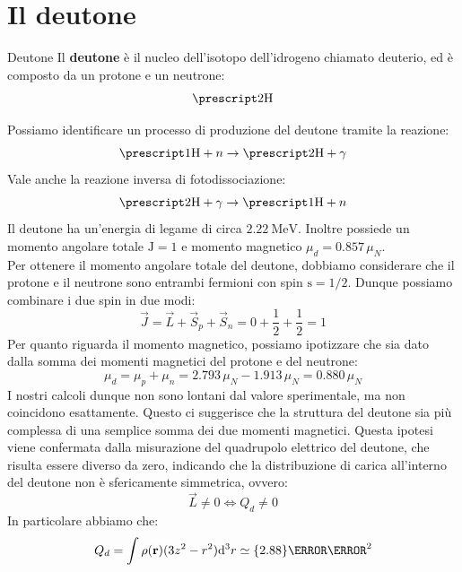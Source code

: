 \section{Il deutone}
\begin{definition}{Deutone}
    Il \textbf{deutone} è il nucleo dell'isotopo dell'idrogeno chiamato deuterio, ed è composto da un protone e un neutrone:
    \begin{equation}
     \atom{H}{2}{}
    \end{equation}
\end{definition}
Possiamo identificare un processo di produzione del deutone tramite la reazione:
\begin{equation}
 \atom{H}{1}{} + n \rightarrow \atom{H}{2}{} + \gamma
\end{equation}
Vale anche la reazione inversa di fotodissociazione:
\begin{equation}
 \atom{H}{2}{} + \gamma \rightarrow \atom{H}{1}{} + n
\end{equation}
Il deutone ha un'energia di legame di circa $\qty{2.22}{\mega\electronvolt}$. Inoltre possiede un momento angolare totale $\text{J}=1$ e momento magnetico $\mu_d = 0.857 \,\mu_N$.\\
Per ottenere il momento angolare totale del deutone, dobbiamo considerare che il protone e il neutrone sono entrambi fermioni con spin $\text{s}=1/2$. Dunque possiamo combinare i due spin in due modi:
\begin{equation}
  \vec{J} = \vec{L} + \vec{S}_p + \vec{S}_n = 0 + \dfrac{1}{2} + \dfrac{1}{2} = 1
\end{equation}
Per quanto riguarda il momento magnetico, possiamo ipotizzare che sia dato dalla somma dei momenti magnetici del protone e del neutrone:
\begin{equation}
 \mu_d = \mu_p + \mu_n = 2.793\,\mu_N - 1.913\,\mu_N = 0.880\,\mu_N
\end{equation}
I nostri calcoli dunque non sono lontani dal valore sperimentale, ma non coincidono esattamente. Questo ci suggerisce che la struttura del deutone sia più complessa di una semplice somma dei due momenti magnetici. Questa ipotesi viene confermata dalla misurazione del quadrupolo elettrico del deutone, che risulta essere diverso da zero, indicando che la distribuzione di carica all'interno del deutone non è sfericamente simmetrica, ovvero:
\begin{equation}
  \vec{L} \neq 0 \iff Q_d \neq 0
\end{equation}
In particolare abbiamo che:
\begin{equation}
 Q_d = \int \rho(\vec{r}) (3z^2 - r^2) \diff{^3 r} \simeq \qty{2.88}{\femto\meter^2}
\end{equation}
